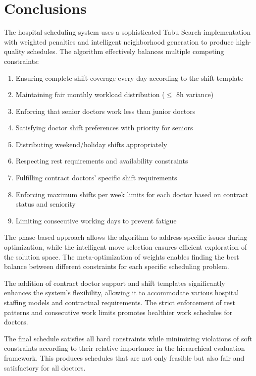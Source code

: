 \documentclass[12pt]{article}
\begin{document}
\section{Conclusions}

The hospital scheduling system uses a sophisticated Tabu Search implementation with weighted penalties and intelligent neighborhood generation to produce high-quality schedules. The algorithm effectively balances multiple competing constraints:

\begin{enumerate}
    \item Ensuring complete shift coverage every day according to the shift template
    \item Maintaining fair monthly workload distribution ($\leq$ 8h variance)
    \item Enforcing that senior doctors work less than junior doctors
    \item Satisfying doctor shift preferences with priority for seniors
    \item Distributing weekend/holiday shifts appropriately
    \item Respecting rest requirements and availability constraints
    \item Fulfilling contract doctors' specific shift requirements
    \item Enforcing maximum shifts per week limits for each doctor based on contract status and seniority
    \item Limiting consecutive working days to prevent fatigue
\end{enumerate}

The phase-based approach allows the algorithm to address specific issues during optimization, while the intelligent move selection ensures efficient exploration of the solution space. The meta-optimization of weights enables finding the best balance between different constraints for each specific scheduling problem.

The addition of contract doctor support and shift templates significantly enhances the system's flexibility, allowing it to accommodate various hospital staffing models and contractual requirements. The strict enforcement of rest patterns and consecutive work limits promotes healthier work schedules for doctors.

The final schedule satisfies all hard constraints while minimizing violations of soft constraints according to their relative importance in the hierarchical evaluation framework. This produces schedules that are not only feasible but also fair and satisfactory for all doctors.
\end{document}
